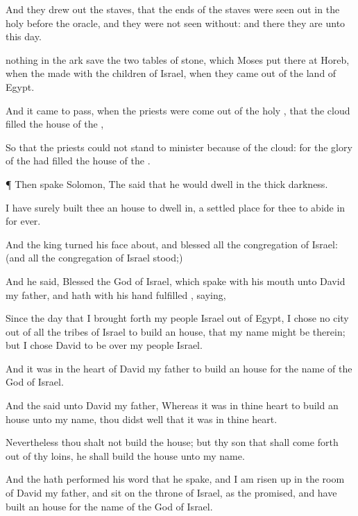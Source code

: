 {And they drew
out the
staves, that the
ends of the
staves were seen
out in the
holy
{}
before the
oracle, and they were not
seen
without: and there they are unto this
day.

 nothing in the
ark
save the
two
tables of
stone, which
Moses
put there at
Horeb, when the
{}
made
{} with the
children of
Israel, when they came
out of the
land of
Egypt.

And it came to pass, when the
priests were come
out of the
holy
{}, that the
cloud
filled the
house of the
{},

So that the
priests
could not
stand to
minister
because of the
cloud: for the
glory of the
{} had
filled the
house of the
{}.


\par }{\PP {}¶ Then
spake
Solomon, The
{}
said that he would
dwell in the thick
darkness.

I have
surely
built thee an
house to dwell
in, a settled
place for thee to abide
in for
ever.

And the
king
turned his
face
about, and
blessed all the
congregation of
Israel: (and all the
congregation of
Israel
stood;)

And he
said,
Blessed
{} the
{}
God of
Israel, which
spake with his
mouth unto
David my
father, and hath with his
hand
fulfilled
{},
saying,

Since the
day that I brought
forth my
people
Israel out of
Egypt, I
chose no
city out of all the
tribes of
Israel to
build an
house, that my
name might be therein; but I
chose
David to be over my
people
Israel.

And it was in the
heart of
David my
father to
build an
house for the
name of the
{}
God of
Israel.

And the
{}
said unto
David my
father,
Whereas it was in thine
heart to
build an
house unto my
name, thou didst
well that it was in thine
heart.

Nevertheless thou shalt not
build the
house; but thy
son that shall come forth
out of thy
loins, he shall
build the
house unto my
name.

And the
{} hath
performed his
word that he
spake, and I am risen
up in the room of
David my
father, and
sit on the
throne of
Israel, as the
{}
promised, and have
built an
house for the
name of the
{}
God of
Israel.

}
